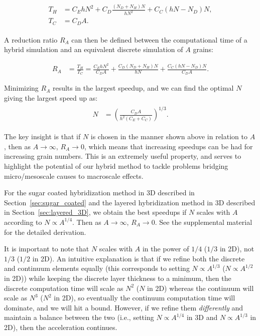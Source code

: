 \begin{align}
\begin{aligned}
T_H &= C_EhN^2 +C_D\frac{(N_D+N_H)N}{hN^2}+C_C(hN-N_D)N , \\
T_C &= C_DA.
\end{aligned}
\end{align}

A reduction ratio $R_A$ can then be defined between the computational time of a hybrid simulation and an equivalent discrete simulation of $A$ grains:

\begin{align}
R_A &=\frac{T_H}{T_C}=\frac{C_E h N^2}{C_DA} +\frac{C_D (N_D+N_H)N}{hN}+\frac{C_C (hN-N_D)N}{C_DA}.
\end{align}

Minimizing $R_A$ results in the largest speedup, 
and we can find the optimal $N$ giving the largest speed up as:
\begin{align}
\begin{aligned}
N & = \left(\frac{C_DA}{h^2(C_E+C_C)}\right)^{1/3}.
\end{aligned}
\end{align}

The key insight is that if $N$ is chosen in the manner shown above in relation to $A$, then as $A\rightarrow\infty$, $R_A\rightarrow0$, which means that increasing speedups
can be had for increasing grain numbers. This is an extremely useful property, and serves to highlight the potential of our hybrid method to tackle problems bridging 
micro/mesoscale causes to macroscale effects. 

For the sugar coated hybridization method in 3D described in Section~\ref{sec:sugar_coated} and the layered hybridization method in 3D described in Section~\ref{sec:layered_3D}, we obtain the best speedups if $N$ scales with $A$ according to $N \propto A^{1/4}$. Then as $A\rightarrow\infty$, $R_A\rightarrow0$. See the supplemental material for the detailed derivation.

It is important to note that $N$ scales with $A$ in the power of $1/4$ ($1/3$ in 2D), not $1/3$ ($1/2$ in 2D).
An intuitive explanation is that if we refine both the discrete and continuum elements equally (this corresponds to setting $N \propto A^{1/3}$ ($N \propto A^{1/2}$ in 2D)) while keeping the discrete layer thickness to a minimum,
then the discrete computation time will scale as $N^2$ ($N$ in 2D) whereas the
continuum will scale as $N^3$ ($N^2$ in 2D), so eventually the continuum computation time will dominate, and we
will hit a bound. However, if we refine them \textit{differently} and maintain a balance between the two (i.e., setting $N \propto A^{1/4}$ in 3D and $N \propto A^{1/3}$ in 2D),
then the acceleration continues.

